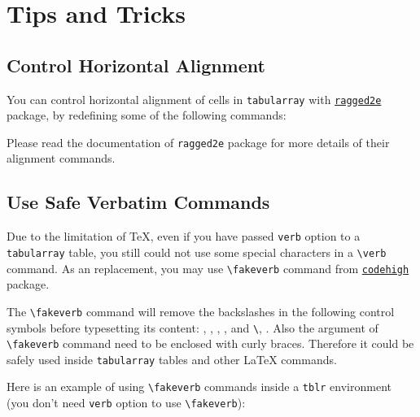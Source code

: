 \documentclass[oneside]{book}
\begin{document}
\chapter{Tips and Tricks}

\section{Control Horizontal Alignment}

You can control horizontal alignment of cells in \texttt{tabularray} with
\href{https://www.ctan.org/pkg/ragged2e}{\texttt{ragged2e}} package,
by redefining some of the following commands:

\begin{codehigh}
\RenewDocumentCommand\TblrAlignBoth{}{\justifying}
\RenewDocumentCommand\TblrAlignLeft{}{\RaggedRight}
\RenewDocumentCommand\TblrAlignCenter{}{\Centering}
\RenewDocumentCommand\TblrAlignRight{}{\RaggedLeft}
\end{codehigh}

Please read the documentation of \texttt{ragged2e} package for more details of
their alignment commands.

\section{Use Safe Verbatim Commands}%
\label{sec:fakeverb}

Due to the limitation of TeX, even if you have passed \texttt{verb} option to a
\texttt{tabularray} table, you still could not use some special characters in a
\verb!\verb! command. As an replacement, you may use \verb|\fakeverb| command from \href{https://www.ctan.org/pkg/codehigh}{\texttt{codehigh}} package.

The \verb|\fakeverb| command will remove the backslashes in the following control symbols before
typesetting its content: \fakeverb{\\\\}, \fakeverb{\\\{}, \fakeverb{\\\}}, \fakeverb{\\\#}, \fakeverb{\\\^} and \texttt{\textbackslash\textvisiblespace}, \fakeverb{\\\%}.
Also the argument of \verb|\fakeverb| command need to be enclosed with curly braces.
Therefore it could be safely used inside \verb|tabularray| tables and other LaTeX commands.

Here is an example of using \verb!\fakeverb! commands inside a \verb|tblr| environment
(you don't need \texttt{verb} option to use \verb!\fakeverb!):
\end{document}
